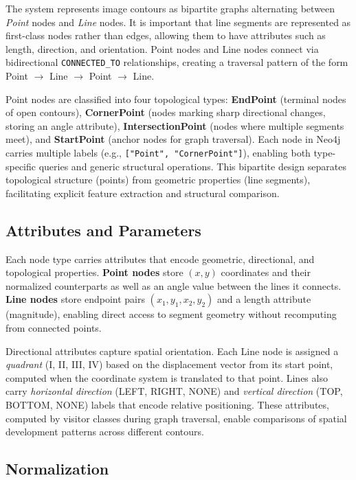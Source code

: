 \documentclass[runningheads]{llncs}
\begin{document}
The system represents image contours as bipartite graphs alternating between \emph{Point} nodes and \emph{Line} nodes. It is important that line segments are represented as first-class nodes rather than edges, allowing them to have attributes such as length, direction, and orientation. Point nodes and Line nodes connect via bidirectional \texttt{CONNECTED\_TO} relationships, creating a traversal pattern of the form Point $\to$ Line $\to$ Point $\to$ Line.

Point nodes are classified into four topological types: \textbf{EndPoint} (terminal nodes of open contours), \textbf{CornerPoint} (nodes marking sharp directional changes, storing an angle attribute), \textbf{IntersectionPoint} (nodes where multiple segments meet), and \textbf{StartPoint} (anchor nodes for graph traversal). Each node in Neo4j carries multiple labels (e.g., \texttt{["Point", "CornerPoint"]}), enabling both type-specific queries and generic structural operations. This bipartite design separates topological structure (points) from geometric properties (line segments), facilitating explicit feature extraction and structural comparison.

\subsection{Attributes and Parameters}

Each node type carries attributes that encode geometric, directional, and topological properties. \textbf{Point nodes} store $(x, y)$ coordinates and their normalized counterparts as well as an angle value between the lines it connects. \textbf{Line nodes} store endpoint pairs $(x_1, y_1, x_2, y_2)$ and a length attribute (magnitude), enabling direct access to segment geometry without recomputing from connected points.

Directional attributes capture spatial orientation. Each Line node is assigned a \emph{quadrant} (I, II, III, IV) based on the displacement vector from its start point, computed when the coordinate system is translated to that point. Lines also carry \emph{horizontal direction} (LEFT, RIGHT, NONE) and \emph{vertical direction} (TOP, BOTTOM, NONE) labels that encode relative positioning. These attributes, computed by visitor classes during graph traversal, enable comparisons of spatial development patterns across different contours.

\subsection{Normalization}
\end{document}
